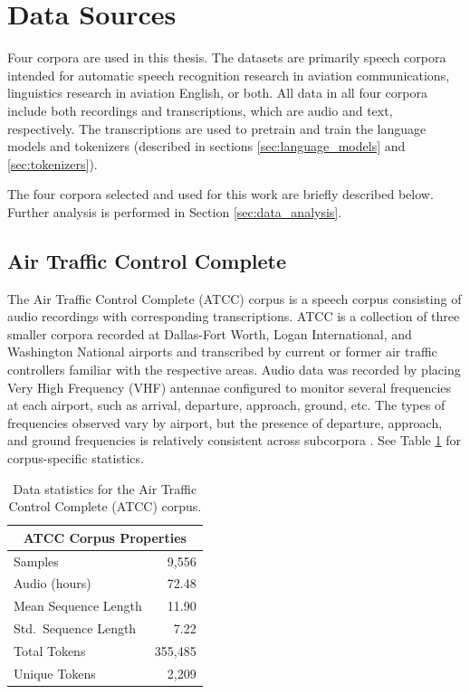 \documentclass[12pt]{article}
\begin{document}
\section{Data Sources}\label{sec:data_source}
Four corpora are used in this thesis. The datasets are primarily speech corpora intended for automatic speech recognition research in aviation
communications, linguistics research in aviation English, or both. All data in all four corpora include both recordings and transcriptions, which are
audio and text, respectively. The transcriptions are used to pretrain and train the language models and tokenizers (described in sections
\ref{sec:language_models} and \ref{sec:tokenizers}).

The four corpora selected and used for this work are briefly described below. Further analysis is performed in Section \ref{sec:data_analysis}.

\subsection{Air Traffic Control Complete}\label{sec:atcc}
The Air Traffic Control Complete (ATCC) corpus is a speech corpus consisting of audio recordings with corresponding transcriptions. ATCC is a
collection of three smaller corpora recorded at Dallas-Fort Worth, Logan International, and Washington National airports and transcribed by current or
former air traffic controllers familiar with the respective areas. Audio data was recorded by placing Very High Frequency (VHF) antennae configured to
monitor several frequencies at each airport, such as arrival, departure, approach, ground, etc. The types of frequencies observed vary by airport, but
the presence of departure, approach, and ground frequencies is relatively consistent across subcorpora \cite{godfrey_air_1994}. See Table
\ref{tab:atcc_stats} for corpus-specific statistics.

\begin{table}[!t]
    \centering
    \begin{tabular}{l r}
        \toprule
        \multicolumn{2}{c}{ATCC Corpus Properties} \\
        \midrule
        Samples              & 9,556               \\
        Audio (hours)        & 72.48               \\
        Mean Sequence Length & 11.90               \\
        Std.~Sequence Length & 7.22                \\

        Total Tokens         & 355,485             \\
        Unique Tokens        & 2,209               \\
        \bottomrule
    \end{tabular}
    \caption{Data statistics for the Air Traffic Control Complete (ATCC) corpus.}
    \label{tab:atcc_stats}
\end{table}
\end{document}
